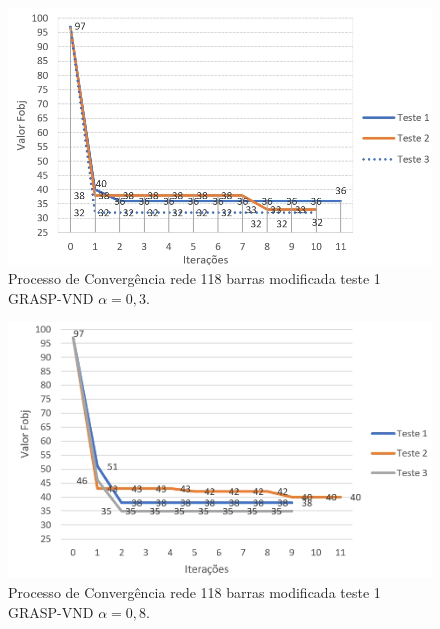 \documentclass[12pt]{article}
\begin{document}
\begin{figure}[H]
	\centering 
	\includegraphics[scale=0.8]{figuras/GRASP_118_1_alpha03.jpg}
	\caption{Processo de Convergência rede 118 barras modificada teste 1 GRASP-VND $\alpha=0,3$.}
	\label{fig16} %
\end{figure}


\begin{figure}[H]
	\centering 
	\includegraphics[scale=0.75]{figuras/GRASP_118_1_alpha08.jpg}
	\caption{Processo de Convergência rede 118 barras modificada teste 1 GRASP-VND $\alpha=0,8$.}
	\label{fig17} %
\end{figure}
\end{document}
